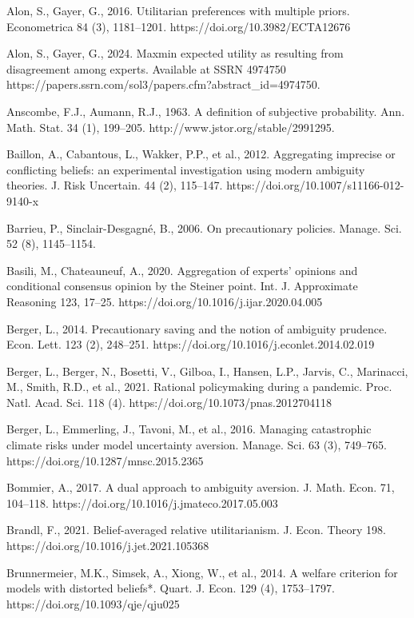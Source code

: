 \documentclass[12pt,a4paper]{article}
\newenvironment{original}
  {\par\noindent\ignorespaces}
  {\par}
\begin{document}
\begin{original}
\small

Alon, S., Gayer, G., 2016. Utilitarian preferences with multiple priors. Econometrica 84 (3), 1181--1201. https://doi.org/10.3982/ECTA12676

Alon, S., Gayer, G., 2024. Maxmin expected utility as resulting from disagreement among experts. Available at SSRN 4974750 https://papers.ssrn.com/sol3/papers.cfm?abstract\_id=4974750.

Anscombe, F.J., Aumann, R.J., 1963. A definition of subjective probability. Ann. Math. Stat. 34 (1), 199--205. http://www.jstor.org/stable/2991295.

Baillon, A., Cabantous, L., Wakker, P.P., et al., 2012. Aggregating imprecise or conflicting beliefs: an experimental investigation using modern ambiguity theories. J. Risk Uncertain. 44 (2), 115--147. https://doi.org/10.1007/s11166-012-9140-x

Barrieu, P., Sinclair-Desgagn\'{e}, B., 2006. On precautionary policies. Manage. Sci. 52 (8), 1145--1154.

Basili, M., Chateauneuf, A., 2020. Aggregation of experts' opinions and conditional consensus opinion by the Steiner point. Int. J. Approximate Reasoning 123, 17--25. https://doi.org/10.1016/j.ijar.2020.04.005

Berger, L., 2014. Precautionary saving and the notion of ambiguity prudence. Econ. Lett. 123 (2), 248--251. https://doi.org/10.1016/j.econlet.2014.02.019

Berger, L., Berger, N., Bosetti, V., Gilboa, I., Hansen, L.P., Jarvis, C., Marinacci, M., Smith, R.D., et al., 2021. Rational policymaking during a pandemic. Proc. Natl. Acad. Sci. 118 (4). https://doi.org/10.1073/pnas.2012704118

Berger, L., Emmerling, J., Tavoni, M., et al., 2016. Managing catastrophic climate risks under model uncertainty aversion. Manage. Sci. 63 (3), 749--765. https://doi.org/10.1287/mnsc.2015.2365

Bommier, A., 2017. A dual approach to ambiguity aversion. J. Math. Econ. 71, 104--118. https://doi.org/10.1016/j.jmateco.2017.05.003

Brandl, F., 2021. Belief-averaged relative utilitarianism. J. Econ. Theory 198. https://doi.org/10.1016/j.jet.2021.105368

Brunnermeier, M.K., Simsek, A., Xiong, W., et al., 2014. A welfare criterion for models with distorted beliefs*. Quart. J. Econ. 129 (4), 1753--1797. https://doi.org/10.1093/qje/qju025


\end{original}
\end{document}
